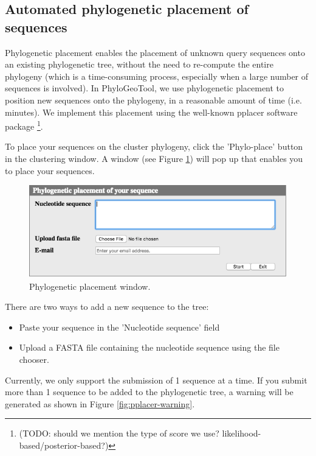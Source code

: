 \documentclass[a4paper, 11pt]{article} %
\begin{document}
\subsection{Automated phylogenetic placement of sequences}
Phylogenetic placement enables the placement of unknown query sequences onto an existing phylogenetic tree, without the need to re-compute the entire phylogeny (which is a time-consuming process, especially when a large number of sequences is involved). 
In PhyloGeoTool, we use phylogenetic placement to position new sequences onto the phylogeny, in a reasonable amount of time (i.e. minutes). 
We implement this placement using the well-known pplacer software package \cite{Matsen2010} \footnote{(TODO: should we mention the type of score we use? likelihood-based/posterior-based?)}.

To place your sequences on the cluster phylogeny, click the 'Phylo-place' button in the clustering window. 
A window (see Figure \ref{fig:pplacerwindow}) will pop up that enables you to place your sequences. 

\begin{figure}[H]
\centering
\includegraphics[scale=0.50]{images/pplacerWindow.png}
\vspace{-0.25cm}
\caption{Phylogenetic placement window.}
\label{fig:pplacerwindow}
\end{figure}

There are two ways to add a new sequence to the tree:
\begin{itemize}
\item Paste your sequence in the 'Nucleotide sequence' field
\item Upload a FASTA file containing the nucleotide sequence using the file chooser.
\end{itemize}
Currently, we only support the submission of 1 sequence at a time.
If you submit more than 1 sequence to be added to the phylogenetic tree, a warning will be generated as shown in Figure \ref{fig:pplacer-warning}.
\end{document}
